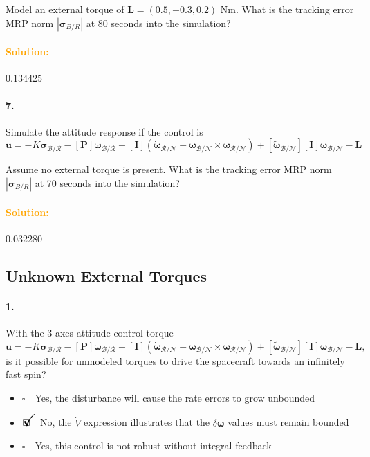 \documentclass[12pt, a4paper]{article}
\newcommand{\ans}{\item[]$\rlap{\LARGE{\checkmark}}\square\quad$}
\newcommand{\noans}{\item[]$\square\quad$}
\begin{document}
Model an external torque of $\bm{L}=(0.5,-0.3,0.2)$ Nm. What is the tracking error MRP norm $|\bm{\sigma}_{B/R}|$ at 80 seconds into the simulation?

\paragraph{\textcolor{orange}{Solution:}}0.134425

\paragraph{7.}
Simulate the attitude response if the control is
$$\bm{u} = -K\bm{\sigma}_{\mathcal{B}/\mathcal{R}} - [\bm{P}]\bm{\omega}_{\mathcal{B}/\mathcal{R}} + [\bm{I}](\dot{\bm{\omega}}_{\mathcal{R}/\mathcal{N}} - \bm{\omega}_{\mathcal{B}/\mathcal{N}} \times \bm{\omega}_{\mathcal{R}/\mathcal{N}}) + [\tilde{\bm{\omega}}_{\mathcal{B}/\mathcal{N}}][\bm{I}]\bm{\omega}_{\mathcal{B}/\mathcal{N}} - \bm{L}$$

Assume no external torque is present. What is the tracking error MRP norm $|\bm{\sigma}_{B/R}|$ at 70 seconds into the simulation?

\paragraph{\textcolor{orange}{Solution:}}0.032280

\newpage
\subsection{Unknown External Torques}
\paragraph{1.}
With the 3-axes attitude control torque
$$\bm{u} = -K\bm{\sigma}_{\mathcal{B}/\mathcal{R}} - [\bm{P}]\bm{\omega}_{\mathcal{B}/\mathcal{R}} + [\bm{I}](\dot{\bm{\omega}}_{\mathcal{R}/\mathcal{N}} - \bm{\omega}_{\mathcal{B}/\mathcal{N}} \times \bm{\omega}_{\mathcal{R}/\mathcal{N}}) + [\tilde{\bm{\omega}}_{\mathcal{B}/\mathcal{N}}][\bm{I}]\bm{\omega}_{\mathcal{B}/\mathcal{N}} - \bm{L},$$
is it possible for unmodeled torques to drive the spacecraft towards an infinitely fast spin?

\begin{itemize}
\noans Yes, the disturbance will cause the rate errors to grow unbounded
\ans No, the $\dot{V}$ expression illustrates that the $\delta \bm{\omega}$ values must remain bounded
\noans Yes, this control is not robust without integral feedback
\end{itemize}
\end{document}
